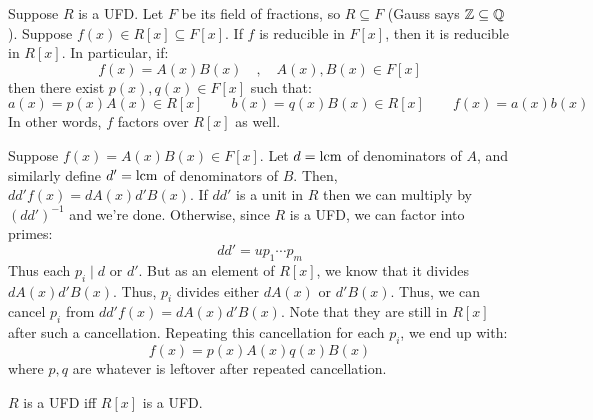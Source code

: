 \begin{thm}[title=Gauss' Lemma]
    Suppose $ R $ is a UFD. Let $ F $ be its field of fractions, so $ R \subseteq F $
    (Gauss says $ \mathbb{Z} \subseteq \mathbb{Q} $). Suppose $ f(x) \in R[x] \subseteq F[x] $. \vsp
    If $ f $ is reducible in $ F[x] $, then it is reducible in $ R[x] $. In particular, if:
    \begin{equation*}
        f(x)=A(x)B(x) \quad , \quad A(x), B(x) \in F[x]
    \end{equation*}
    then there exist $ p(x), q(x) \in F[x] $ such that:
    \begin{equation*}
        a(x) = p(x)A(x) \in R[x] \qquad b(x)=q(x)B(x) \in R[x] \qquad
        f(x)=a(x)b(x)
    \end{equation*}
    In other words, $ f $ factors over $ R[x] $ as well.
\end{thm}

\begin{pf}[source=Primary Source Material]
    Suppose $ f(x) = A(x)B(x) \in F[x] $. Let $ d = \operatorname{lcm} $ of denominators of $ A $, and similarly
    define $ d' = \operatorname{lcm} $ of denominators of $ B $.
    Then, $ dd'f(x) = dA(x)d'B(x) $. \vsp
    If $ dd' $ is a unit in $ R $ then we can multiply by $ (dd')^{-1} $ and we're done.
    Otherwise, since $ R $ is a UFD, we can factor into primes:
    \begin{equation*}
        dd' = up_{1}\cdots p_{m}
    \end{equation*}
    Thus each $ p_{i} \mid d $ or $ d' $. But as an element of $ R[x] $, we know that it divides
    $ dA(x)d'B(x) $. \vsp
    Thus, $ p_{i} $ divides either $ dA(x) $ or $ d'B(x) $. Thus, we can cancel $ p_{i} $ from
    $ dd'f(x) = dA(x)d'B(x) $. Note that they are still in $ R[x] $ after such a cancellation. \vsp
    Repeating this cancellation for each $ p_{i} $, we end up with:
    \begin{equation*}
        f(x) = p(x)A(x)q(x)B(x)
    \end{equation*}
    where $ p, q $ are whatever is leftover after repeated cancellation.
\end{pf}

\begin{thm}
    $ R $ is a UFD iff $ R[x] $ is a UFD.
\end{thm}

